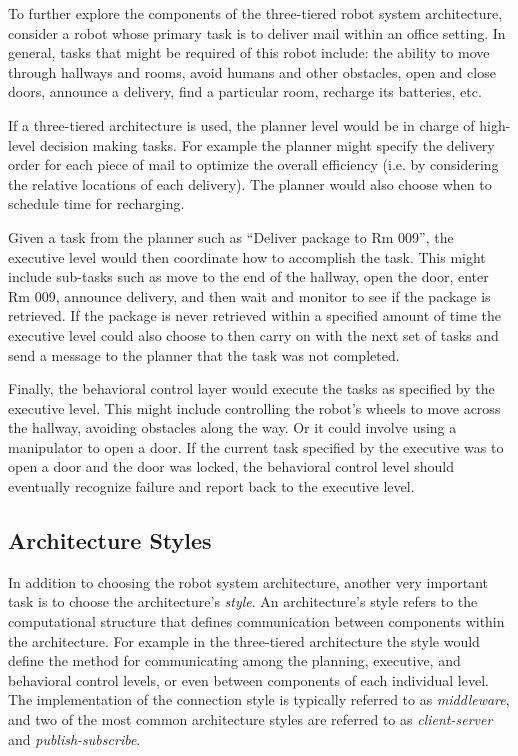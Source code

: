 \begin{example}
To further explore the components of the three-tiered robot system architecture, consider a robot whose primary task is to deliver mail within an office setting. In general, tasks that might be required of this robot include: the ability to move through hallways and rooms, avoid humans and other obstacles, open and close doors, announce a delivery, find a particular room, recharge its batteries, etc.

If a three-tiered architecture is used, the planner level would be in charge of high-level decision making tasks. For example the planner might specify the delivery order for each piece of mail to optimize the overall efficiency (i.e. by considering the relative locations of each delivery). The planner would also choose when to schedule time for recharging.

Given a task from the planner such as ``Deliver package to Rm 009'', the executive level would then coordinate how to accomplish the task. This might include sub-tasks such as move to the end of the hallway, open the door, enter Rm 009, announce delivery, and then wait and monitor to see if the package is retrieved. If the package is never retrieved within a specified amount of time the executive level could also choose to then carry on with the next set of tasks and send a message to the planner that the task was not completed.

Finally, the behavioral control layer would execute the tasks as specified by the executive level. This might include controlling the robot's wheels to move across the hallway, avoiding obstacles along the way. Or it could involve using a manipulator to open a door. If the current task specified by the executive was to open a door and the door was locked, the behavioral control level should eventually recognize failure and report back to the executive level.
\end{example}

\subsection{Architecture Styles}
In addition to choosing the robot system architecture, another very important task is to choose the architecture's \textit{style}.
An architecture's style refers to the computational structure that defines communication between components within the architecture. For example in the three-tiered architecture the style would define the method for communicating among the planning, executive, and behavioral control levels, or even between components of each individual level. The implementation of the connection style is typically referred to as \textit{middleware}, and two of the most common architecture styles are referred to as \textit{client-server} and \textit{publish-subscribe}.

